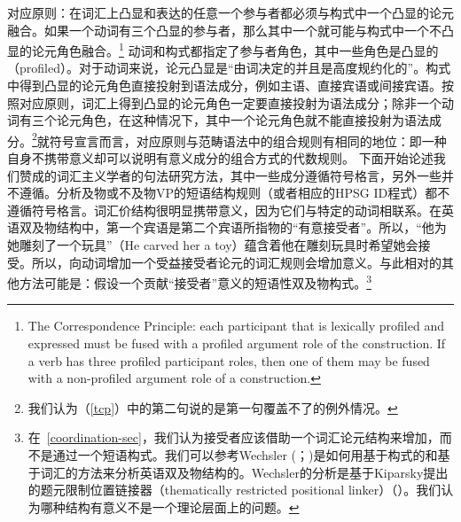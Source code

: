 \ea
对应原则：在词汇上凸显和表达的任意一个参与者都必须与构式中一个凸显的论元融合。如果一个动词有三个凸显的参与者，那么其中一个就可能与构式中一个不凸显的论元角色融合。\citep[]{Goldberg95a}\footnote{%
The Correspondence Principle:  each participant that is lexically profiled and expressed must be
fused with a profiled argument role of the construction.  If a verb has three profiled participant
roles, then one of them may be fused with a non-profiled argument role of a construction. 
}\label{tcp}
\z
动词和构式都指定了参与者角色，其中一些角色是凸显的（profiled）。对于动词来说，论元凸显是“由词决定的并且是高度规约化的”\citep[]{Goldberg95a}。构式中得到凸显的论元角色直接投射到语法成分，例如主语、直接宾语或间接宾语。按照对应原则，词汇上得到凸显的论元角色一定要直接投射为语法成分；除非一个动词有三个论元角色，在这种情况下，其中一个论元角色就不能直接投射为语法成分。\footnote{我们认为（\ref{tcp}）中的第二句说的是第一句覆盖不了的例外情况。}就符号宣言而言，对应原则与范畴语法中的组合规则有相同的地位：即一种自身不携带意义却可以说明有意义成分的组合方式的代数规则。
    下面开始论述我们赞成的词汇主义学者的句法研究方法，其中一些成分遵循符号格言，另外一些并不遵循。分析及物或不及物VP的短语结构规则（或者相应的HPSG ID程式）都不遵循符号格言。词汇价结构很明显携带意义，因为它们与特定的动词相联系。在英语双及物结构中，第一个宾语是第二个宾语所指物的“有意接受者”。所以，“他为她雕刻了一个玩具”（He carved her a toy）蕴含着他在雕刻玩具时希望她会接受。所以，向动词增加一个受益接受者论元的词汇规则会增加意义。与此相对的其他方法可能是：假设一个贡献“接受者”意义的短语性双及物构式。\footnote{%
在~\ref{coordination-sec}，我们认为接受者应该借助一个词汇论元结构来增加，而不是通过一个短语构式。我们可以参考Wechsler (\citeyear[--113]{Wechsler91a-u}；\citeyear[--89]{Wechsler95a-u})是如何用基于构式的和基于词汇的方法来分析英语双及物结构的。Wechsler的分析是基于Kiparsky提出的题元限制位置链接器（thematically restricted positional linker）（\citeyear{Kiparsky87a-u, Kiparsky88a-u}）。我们认为哪种结构有意义不是一个理论层面上的问题。
}
